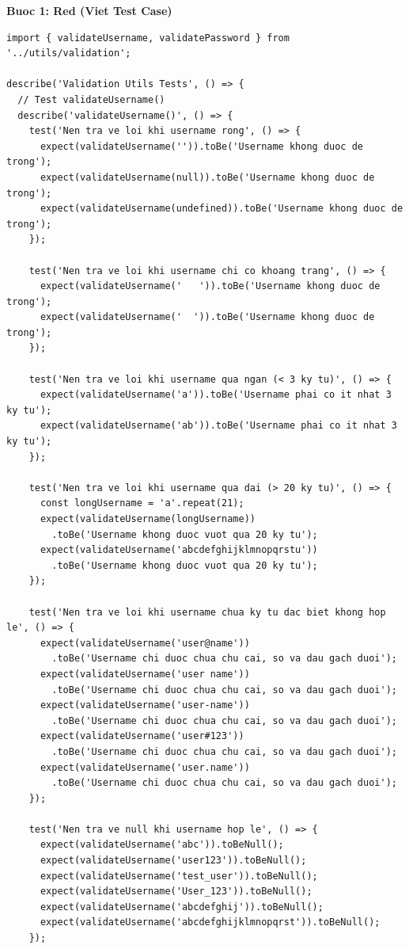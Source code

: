 \textbf{Buoc 1: Red (Viet Test Case)}
\begin{lstlisting}[caption=Frontend Login Validation Tests]
import { validateUsername, validatePassword } from '../utils/validation';

describe('Validation Utils Tests', () => {
  // Test validateUsername()
  describe('validateUsername()', () => {
    test('Nen tra ve loi khi username rong', () => {
      expect(validateUsername('')).toBe('Username khong duoc de trong');
      expect(validateUsername(null)).toBe('Username khong duoc de trong');
      expect(validateUsername(undefined)).toBe('Username khong duoc de trong');
    });
    
    test('Nen tra ve loi khi username chi co khoang trang', () => {
      expect(validateUsername('   ')).toBe('Username khong duoc de trong');
      expect(validateUsername('  ')).toBe('Username khong duoc de trong');
    });
    
    test('Nen tra ve loi khi username qua ngan (< 3 ky tu)', () => {
      expect(validateUsername('a')).toBe('Username phai co it nhat 3 ky tu');
      expect(validateUsername('ab')).toBe('Username phai co it nhat 3 ky tu');
    });
    
    test('Nen tra ve loi khi username qua dai (> 20 ky tu)', () => {
      const longUsername = 'a'.repeat(21);
      expect(validateUsername(longUsername))
        .toBe('Username khong duoc vuot qua 20 ky tu');
      expect(validateUsername('abcdefghijklmnopqrstu'))
        .toBe('Username khong duoc vuot qua 20 ky tu');
    });
    
    test('Nen tra ve loi khi username chua ky tu dac biet khong hop le', () => {
      expect(validateUsername('user@name'))
        .toBe('Username chi duoc chua chu cai, so va dau gach duoi');
      expect(validateUsername('user name'))
        .toBe('Username chi duoc chua chu cai, so va dau gach duoi');
      expect(validateUsername('user-name'))
        .toBe('Username chi duoc chua chu cai, so va dau gach duoi');
      expect(validateUsername('user#123'))
        .toBe('Username chi duoc chua chu cai, so va dau gach duoi');
      expect(validateUsername('user.name'))
        .toBe('Username chi duoc chua chu cai, so va dau gach duoi');
    });
    
    test('Nen tra ve null khi username hop le', () => {
      expect(validateUsername('abc')).toBeNull();
      expect(validateUsername('user123')).toBeNull();
      expect(validateUsername('test_user')).toBeNull();
      expect(validateUsername('User_123')).toBeNull();
      expect(validateUsername('abcdefghij')).toBeNull();
      expect(validateUsername('abcdefghijklmnopqrst')).toBeNull();
    });
    

\end{lstlisting}
